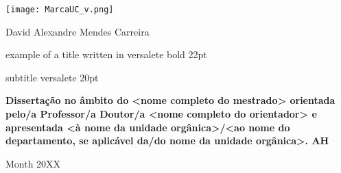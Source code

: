 \documentclass[class=report, crop=false, a4paper]{standalone}
\begin{document}

\pagecolor{CoverUC}\afterpage{\nopagecolor}

\begin{center}
    \color{CoverUCTypo}
    \texttt{[image: MarcaUC\_v.png]}
    \vspace{3cm}

    \fontsize{18pt}{18pt}\selectfont
    \par{\ArrusBt David Alexandre Mendes Carreira}
    \vspace{2cm}

    \fontsize{22pt}{22pt}\selectfont
    \par{\ArrusBtScB example of a title written in versalete bold 22pt}
    \fontsize{20pt}{20pt}\selectfont
    \par{\ArrusBtSc subtitle versalete 20pt}
    \vspace{2cm}

    \vfill
    \fontsize{12pt}{12pt}\selectfont
    \par\textbf{\ArrusBt Dissertação no âmbito do <nome completo do mestrado> orientada pelo/a Professor/a Doutor/a
    <nome completo do orientador> e apresentada <à nome da unidade
    orgânica>/<ao nome do departamento, se aplicável da/do nome
    da unidade orgânica>. AH}
    
    \vfill
    \fontsize{16pt}{16pt}\selectfont
    \par {\ArrusBt Month 20XX}
\end{center}
\restoregeometry
\newpage
\end{document}
